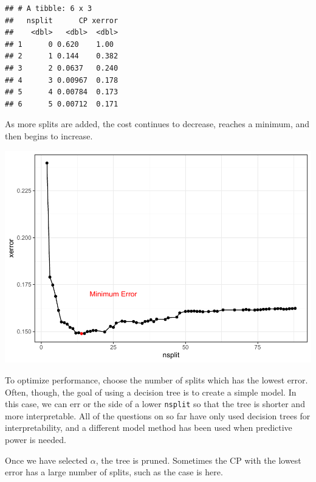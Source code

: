\documentclass[openany]{book}
\newenvironment{Shaded}{\begin{snugshade}}{\end{snugshade}}
\newcommand{\KeywordTok}[1]{\textcolor[rgb]{0.13,0.29,0.53}{\textbf{#1}}}
\newcommand{\NormalTok}[1]{#1}
\newcommand{\OperatorTok}[1]{\textcolor[rgb]{0.81,0.36,0.00}{\textbf{#1}}}
\newcommand{\StringTok}[1]{\textcolor[rgb]{0.31,0.60,0.02}{#1}}
\begin{document}
\begin{verbatim}
## # A tibble: 6 x 3
##   nsplit      CP xerror
##    <dbl>   <dbl>  <dbl>
## 1      0 0.620    1.00 
## 2      1 0.144    0.382
## 3      2 0.0637   0.240
## 4      3 0.00967  0.178
## 5      4 0.00784  0.173
## 6      5 0.00712  0.171
\end{verbatim}

As more splits are added, the cost continues to decrease, reaches a minimum, and then begins to increase.

\includegraphics{06-tree-based-models_files/figure-latex/unnamed-chunk-6-1.pdf}

To optimize performance, choose the number of splits which has the lowest error. Often, though, the goal of using a decision tree is to create a simple model. In this case, we can err or the side of a lower \texttt{nsplit} so that the tree is shorter and more interpretable. All of the questions on so far have only used decision trees for interpretability, and a different model method has been used when predictive power is needed.

Once we have selected \(\alpha\), the tree is pruned. Sometimes the CP with the lowest error has a large number of splits, such as the case is here.

\begin{Shaded}
\end{Shaded}
\end{document}
